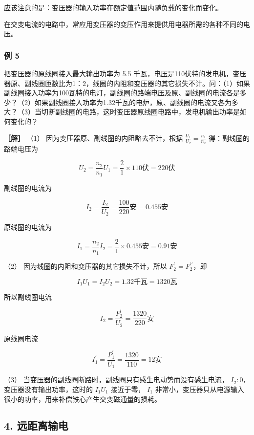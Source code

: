 应该注意的是：变压器的输入功率在额定值范围内随负载的变化而变化。

在交变电流的电路中，常应用变压器的变压作用来提供用电器所需的各种不同的电压。

\subsubsection{例 5}\label{ux4f8b-5-2}

把变压器的原线圈接入最大输出功率为 5.5
千瓦，电压是110伏特的发电机，变压器原、副线圈匝数比为1：2，线圈的内阻和变压器的其它损失不计。问：（1）如果副线圈接入功率为100瓦特的电灯，副线圈的路端电压及原、副线圈的电流各是多少？（2）如果副线圈接入功率为1.32千瓦的电炉，原、副线圈的电流又各为多大？（3）当切断副线圈的电路，这时变压器原线圈电路中，发电机输出功率是如何变化的？

\textbf{［解］} （1） 因为变压器原、副线圈的内阻略去不计，根据
\(\frac{U_1}{U_2} = \frac{n_1}{n_2}\) 得：副线圈的路端电压为

\[
U_{2} = \frac{n_{2}}{n_{1}} U_{1} = \frac{2}{1} \times 110 \text{伏} = 220 \text{伏}
\]

副线圈的电流为

\[
I_{2} = \frac{I_{2}}{U_{2}} = \frac{100}{220} \text{安} = 0.455 \text{安}
\]

原线圈的电流为

\[
I_{1} = \frac{n_{2}}{n_{1}} I_{2} = \frac{2}{1} \times 0.455 \text{安} = 0.91 \text{安}
\]

（2） 因为线圈的内阻和变压器的其它损失不计，所以
\(F_{2}^{\prime} = F_{2}^{\prime \prime}\)，即

\[
I_{1} U_{1} = I_{2} U_{2} = 1.32 \text{千瓦} = 1320 \text{瓦}
\]

所以副线圈电流

\[
I_{2} = \frac{P_{2}^{\prime}}{U_{2}} = \frac{1320}{220} \text{安}
\]

原线圈电流

\[
I_{1}^{\prime} = \frac{P_{1}^{\prime}}{U_{1}} = \frac{1320}{110} = 12 \text{安}
\]

（3） 当变压器的副线圈断路时，副线圈只有感生电动势而没有感生电流，
\(I_{2}:0\)，变压器没有输出功率，这时的 \(I_{1}U_{1}\) 接近于零，
\(I_{1}\)
非常小，变压器只从电源输入很小的功率，用来补偿铁心产生交变磁通量的损耗。

\subsection{4. 远距离输电}\label{ux8fdcux8dddux79bbux8f93ux7535}

